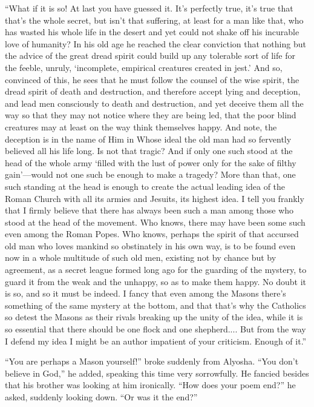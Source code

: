 ``What if it is so! At last you have guessed it. It's perfectly true,
it's true that that's the whole secret, but isn't that suffering, at
least for a man like that, who has wasted his whole life in the desert
and yet could not shake off his incurable love of humanity? In his old
age he reached the clear conviction that nothing but the advice of the
great dread spirit could build up any tolerable sort of life for the
feeble, unruly, `incomplete, empirical creatures created in jest.' And
so, convinced of this, he sees that he must follow the counsel of the
wise spirit, the dread spirit of death and destruction, and therefore
accept lying and deception, and lead men consciously to death and
destruction, and yet deceive them all the way so that they may not
notice where they are being led, that the poor blind creatures may at
least on the way think themselves happy. And note, the deception is in
the name of Him in Whose ideal the old man had so fervently believed
all his life long. Is not that tragic? And if only one such stood at
the head of the whole army `filled with the lust of power only for the
sake of filthy gain'---would not one such be enough to make a tragedy?
More than that, one such standing at the head is enough to create the
actual leading idea of the Roman Church with all its armies and
Jesuits, its highest idea. I tell you frankly that I firmly believe
that there has always been such a man among those who stood at the
head of the movement. Who knows, there may have been some such even
among the Roman Popes. Who knows, perhaps the spirit of that accursed
old man who loves mankind so obstinately in his own way, is to be
found even now in a whole multitude of such old men, existing not by
chance but by agreement, as a secret league formed long ago for the
guarding of the mystery, to guard it from the weak and the unhappy, so
as to make them happy. No doubt it is so, and so it must be indeed. I
fancy that even among the Masons there's something of the same mystery
at the bottom, and that that's why the Catholics so detest the Masons
as their rivals breaking up the unity of the idea, while it is so
essential that there should be one flock and one shepherd....
 But from the way I defend my idea I might be an author
impatient of your criticism. Enough of it.''

``You are perhaps a Mason yourself!'' broke suddenly from Alyosha.
``You don't believe in God,'' he added, speaking this time very
sorrowfully. He fancied besides that his brother was looking at him
ironically. ``How does your poem end?'' he asked, suddenly looking
down. ``Or was it the end?''

